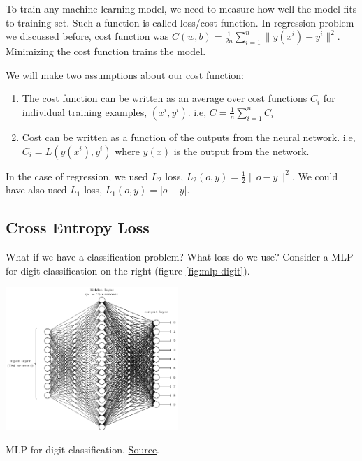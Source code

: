 \documentclass[a4paper]{tufte-handout}
\begin{document}
To train any machine learning model, we need to measure how well 
the model fits to training set. Such a function is called loss/cost
 function.
In regression problem we discussed before, cost function was 
\(C(w, b) = \frac{1}{2n} \sum_{i = 1}^{n} \| y(x^i) - y^i\|^2\). 
Minimizing the cost function trains the model.

We will make two assumptions about our cost function:

\begin{enumerate}
\item
  The cost function can be written as an average over cost functions
  \(C_i\) for individual training examples, \((x^i, y^i)\). i.e,
  \(C = \frac{1}{n} \sum_{i = 1}^{n} C_i\)
\item
  Cost can be written as a function of the outputs from the neural
  network. i.e, \(C_i = L(y(x^i), y^i)\) where \(y(x)\) is the output
  from the network.
\end{enumerate}

In the case of regression, we used \(L_2\) loss,
\(L_2(o, y) = \frac{1}{2} \| o - y\|^2\). We could have also used \(L_1\)
loss, \(L_1(o, y) = | o - y |\).

\subsection{Cross Entropy Loss}

What if we have a classification problem? What loss do we use? Consider
a MLP for digit classification on the right (figure \ref{fig:mlp-digit}).

\begin{marginfigure}[20mm]
  \includegraphics[width=65mm]{tikz12}
  \caption{ MLP for digit classification.
  \href{http://neuralnetworksanddeeplearning.com/chap1.html\%22}{Source}.
  }
\label{fig:mlp-digit}
\end{marginfigure}
\end{document}
